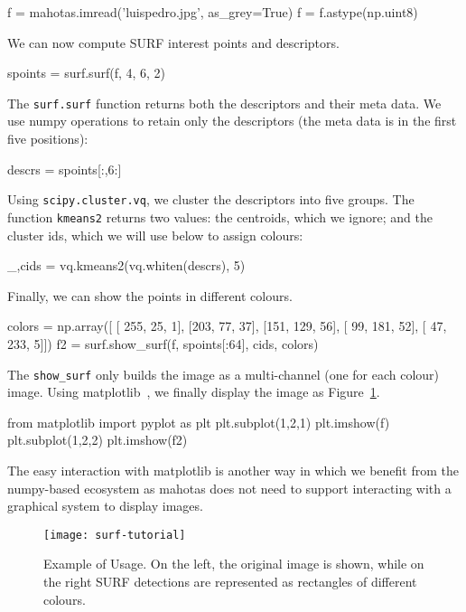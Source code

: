 \documentclass{scrartcl}
\let\code\texttt
\begin{document}
\begin{python}
f = mahotas.imread('luispedro.jpg', as_grey=True)
f = f.astype(np.uint8)
\end{python}

We can now compute SURF interest points and descriptors.
\begin{python}
spoints = surf.surf(f, 4, 6, 2)
\end{python}

The \code{surf.surf} function returns both the descriptors and their meta data.
We use numpy operations to retain only the descriptors (the meta data is in the
first five positions):

\begin{python}
descrs = spoints[:,6:]
\end{python}

Using \code{scipy.cluster.vq}, we cluster the descriptors into five groups. The
function \code{kmeans2} returns two values: the centroids, which we ignore; and
the cluster ids, which we will use below to assign colours:
\begin{python}
_,cids = vq.kmeans2(vq.whiten(descrs), 5)
\end{python}

Finally, we can show the points in different colours.
\begin{python}
colors = np.array([
    [ 255,  25,   1],
    [203,  77,  37],
    [151, 129,  56],
    [ 99, 181,  52],
    [ 47, 233,   5]])
f2 = surf.show_surf(f, spoints[:64], cids, colors)
\end{python}

The \texttt{show\_surf} only builds the image as a multi-channel (one for each
colour) image. Using matplotlib~\citep{10.1109/MCSE.2007.55}, we finally
display the image as Figure~\ref{fig:surf}.

\begin{python}
from matplotlib import pyplot as plt
plt.subplot(1,2,1)
plt.imshow(f)
plt.subplot(1,2,2)
plt.imshow(f2)
\end{python}

The easy interaction with matplotlib is another way in which we benefit from
the numpy-based ecosystem as mahotas does not need to support interacting with
a graphical system to display images.

\begin{figure}
\begin{center}
\texttt{[image: surf-tutorial]}
\end{center}
\caption{Example of Usage. On the left, the original image is shown, while on
the right SURF detections are represented as rectangles of different colours.}
\label{fig:surf}
\end{figure}
\end{document}
